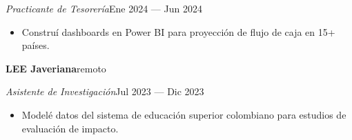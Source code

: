\documentclass[a4paper,10pt]{article}
\newcommand{\row}[2]{\textbf{\color{ink}#1}\hfill{\small #2}\par}
\begin{document}
\textit{Practicante de Tesorería}\hfill{\small Ene 2024 --- Jun 2024}\par
\begin{itemize}[leftmargin=1em, itemsep=0pt, topsep=1pt, parsep=0pt]
  \item Construí dashboards en Power BI para proyección de flujo de caja en 15+ países.
\end{itemize}
\vspace{2pt}
\row{LEE Javeriana}{remoto}
\textit{Asistente de Investigación}\hfill{\small Jul 2023 --- Dic 2023}\par
\begin{itemize}[leftmargin=1em, itemsep=0pt, topsep=1pt, parsep=0pt]
  \item Modelé datos del sistema de educación superior colombiano para estudios de evaluación de impacto.
\end{itemize}
\end{document}
